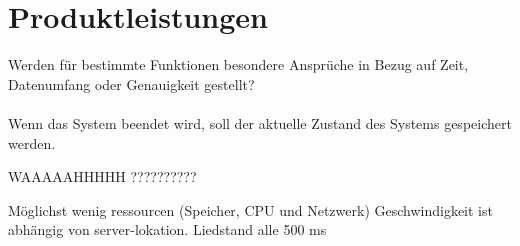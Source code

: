 \chapter{Produktleistungen}
Werden für bestimmte Funktionen besondere Ansprüche in Bezug auf Zeit, Datenumfang oder Genauigkeit gestellt?\ \\ \\
Wenn das System beendet wird, soll der aktuelle Zustand des Systems gespeichert werden.



WAAAAAHHHHH ??????????


Möglichst wenig ressourcen (Speicher, CPU und Netzwerk)
						Geschwindigkeit ist abhängig von server-lokation.
						Liedstand alle 500 ms